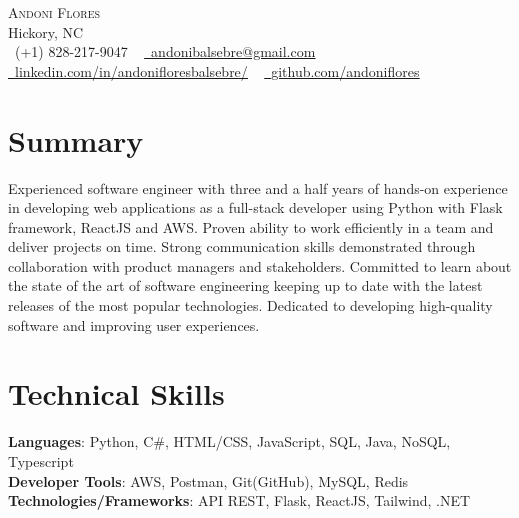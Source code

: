\documentclass[letterpaper,11pt]{article}
\newcommand{\resumeSubHeadingListStart}{\begin{itemize}[leftmargin=0.0in, label={}]}
\newcommand{\resumeSubHeadingListEnd}{\end{itemize}}
\begin{document}

\begin{center}
    {\Huge \scshape Andoni Flores} \\ \vspace{1pt}
    Hickory, NC \\ \vspace{1pt}
    \small \raisebox{-0.1\height}\faPhone\ (+1) 828-217-9047 ~ \href{mailto:andonibalsebre@gmail.com}{\raisebox{-0.2\height}\faEnvelope\  \underline{andonibalsebre@gmail.com}} ~ 
    \href{https://linkedin.com/in/andonifloresbalsebre/}{\raisebox{-0.2\height}\faLinkedin\ \underline{linkedin.com/in/andonifloresbalsebre/}}  ~
    \href{https://github.com/andoniflores}{\raisebox{-0.2\height}\faGithub\ \underline{github.com/andoniflores}}
    \vspace{-8pt}
\end{center}

%
\section{Summary}
  \resumeSubHeadingListStart
    \small{\item{Experienced software engineer with three and a half years of hands-on experience
        in developing web applications as a full-stack developer using Python with Flask
        framework, ReactJS and AWS. Proven ability to work efficiently in a team and deliver
        projects on time. Strong communication skills demonstrated through collaboration with
        product managers and stakeholders. Committed to learn about the state of the art of software 
        engineering keeping up to date with the latest releases of the most popular technologies. 
        Dedicated to developing high-quality software and improving user experiences.}}
  \resumeSubHeadingListEnd

\section{Technical Skills}
 \begin{itemize}[leftmargin=0.15in, label={}]
    \small{\item{
     \textbf{Languages}{: Python, C\#, HTML/CSS, JavaScript, SQL, Java, NoSQL, Typescript} \\
     \textbf{Developer Tools}{: AWS, Postman, Git(GitHub), MySQL, Redis} \\
     \textbf{Technologies/Frameworks}{: API REST, Flask, ReactJS, Tailwind, .NET} \\
    }}
 \end{itemize}
 \vspace{-16pt}
\end{document}
